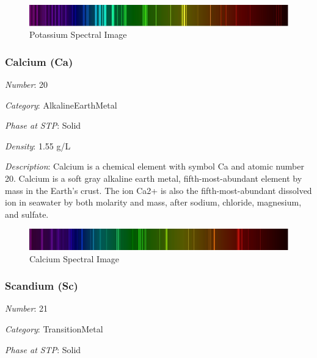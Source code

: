 \documentclass{article}
\begin{document}
\immediate{}
\begin{figure}[!ht]
    \centering
    \includegraphics[width=12cm]{./resources/spectral_img/Potassium_Spectrum.jpg}
    \caption{Potassium Spectral Image}
\end{figure}

\hypertarget{subsubsection::Ca}{}\subsubsection{Calcium (Ca)}

\textit{Number}: 20

\textit{Category}: AlkalineEarthMetal

\textit{Phase at STP}: Solid

\textit{Density}: 1.55 g/L

\textit{Description}: Calcium is a chemical element with symbol Ca and atomic number 20. Calcium is a soft gray alkaline earth metal, fifth-most-abundant element by mass in the Earth's crust. The ion Ca2+ is also the fifth-most-abundant dissolved ion in seawater by both molarity and mass, after sodium, chloride, magnesium, and sulfate.

\immediate{}
\begin{figure}[!ht]
    \centering
    \includegraphics[width=12cm]{./resources/spectral_img/Calcium_Spectrum.png}
    \caption{Calcium Spectral Image}
\end{figure}

\hypertarget{subsubsection::Sc}{}\subsubsection{Scandium (Sc)}

\textit{Number}: 21

\textit{Category}: TransitionMetal

\textit{Phase at STP}: Solid
\end{document}
